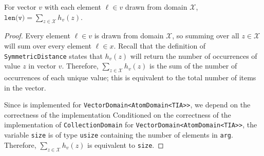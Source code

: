 \documentclass{article}
\begin{document}
\begin{lemma}
    \label{lemma:len-sum-equiv}
    For vector $v$ with each element $\ell\in v$ drawn from domain $\mathcal{X}$, $\texttt{len(v)} = \sum_{z\in\mathcal{X}} h_v(z)$.
\end{lemma}

\begin{proof}
    Every element $\ell \in v$ is drawn from domain $\mathcal{X}$, so summing over all $z\in \mathcal{X}$ will sum over every element $\ell\in x$.
    Recall that the definition of \texttt{SymmetricDistance} states that $h_v(z)$ will return the number of occurrences of value $z$ in vector $v$.
    Therefore, $\sum_{z\in\mathcal{X}} h_v(z)$ is the sum of the number of occurrences of each unique value;
    this is equivalent to the total number of items in the vector.

    Since  is implemented for \texttt{VectorDomain<AtomDomain<TIA>>},
    we depend on the correctness of the implementation
    Conditioned on the correctness of the implementation of \texttt{CollectionDomain} for \texttt{VectorDomain<AtomDomain<TIA>>},
    the variable \texttt{size} is of type \texttt{usize} containing the number of elements in \texttt{arg}.
    Therefore, $\sum_{z\in\mathcal{X}} h_v(z)$ is equivalent to \texttt{size}.
\end{proof}
\end{document}
